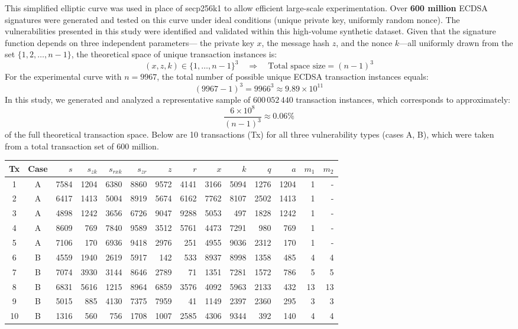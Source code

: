\documentclass[11pt]{article}
\begin{document}
This simplified elliptic curve was used in place of secp256k1 to allow efficient large-scale experimentation. Over \textbf{600 million} ECDSA signatures were generated and tested on this curve under ideal conditions (unique private key, uniformly random nonce). The vulnerabilities presented in this study were identified and validated within this high-volume synthetic dataset. Given that the signature function depends on three independent parameters—
the private key $x$, the message hash $z$, and the nonce $k$—all uniformly drawn from the set $\{1, 2, \dots, n-1\}$,
the theoretical space of unique transaction instances is:   
\[
(x, z, k) \in \{1, \dots, n-1\}^3 \quad \Rightarrow \quad \text{Total space size} = (n - 1)^3
\]
For the experimental curve with $n = 9967$, the total number of possible unique ECDSA transaction instances equals:
\[
(9967 - 1)^3 = 9966^3 \approx 9.89 \times 10^{11}
\]
In this study, we generated and analyzed a representative sample of $600\,052\,440$ transaction instances, which corresponds to approximately:
\[
\frac{6 \times 10^8}{(n - 1)^3} \approx 0.06\%
\]
of the full theoretical transaction space. Below are 10 transactions (Tx) for all three vulnerability types (cases A, B), which were taken from a total transaction set of 600 million.

\begin{center}
\small
\begin{tabular}{|c|c|r|r|r|r|r|r|r|r|r|r|r|r|}
\hline
Tx & Case & $s$ & $s_{zk}$ & $s_{rxk}$ & $s_{zr}$ & $z$ & $r$ & $x$ & $k$ & $q$ & $a$ & $m_1$ & $m_2$ \\
\hline
1 & A & 7584 & 1204 & 6380 & 8860 & 9572 & 4141 & 3166 & 5094 & 1276 & 1204 & 1 & - \\
2 & A & 6417 & 1413 & 5004 & 8919 & 5674 & 6162 & 7762 & 8107 & 2502 & 1413 & 1 & - \\
3 & A & 4898 & 1242 & 3656 & 6726 & 9047 & 9288 & 5053 & 497 & 1828 & 1242 & 1 & - \\
4 & A & 8609 & 769 & 7840 & 9589 & 3512 & 5761 & 4473 & 7291 & 980 & 769 & 1 & - \\
5 & A & 7106 & 170 & 6936 & 9418 & 2976 & 251 & 4955 & 9036 & 2312 & 170 & 1 & - \\
6 & B & 4559 & 1940 & 2619 & 5917 & 142 & 533 & 8937 & 8998 & 1358 & 485 & 4 & 4 \\
7 & B & 7074 & 3930 & 3144 & 8646 & 2789 & 71 & 1351 & 7281 & 1572 & 786 & 5 & 5 \\
8 & B & 6831 & 5616 & 1215 & 8964 & 6859 & 3576 & 4092 & 5963 & 2133 & 432 & 13 & 13 \\
9 & B & 5015 & 885 & 4130 & 7375 & 7959 & 41 & 1149 & 2397 & 2360 & 295 & 3 & 3 \\
10 & B & 1316 & 560 & 756 & 1708 & 1007 & 2585 & 4306 & 9344 & 392 & 140 & 4 & 4 \\
\hline
\end{tabular}
\end{center}
\end{document}
